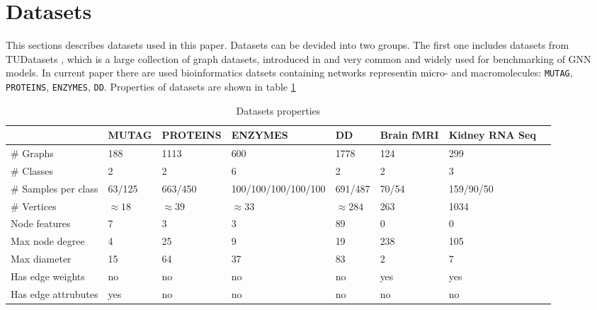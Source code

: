 \section{Datasets}
\label{sec:datasets}

This sections describes datasets used in this paper. Datasets can be devided into two groups.
The first one includes datasets from TUDatasets \cite{TUDataset}, which is
a large collection of graph datasets, introduced in \cite{TUDataset} and very common and widely used for benchmarking of GNN models.
In current paper there are used bioinformatics datsets containing networks representin micro- and macromolecules: \texttt{MUTAG}, \texttt{PROTEINS},
\texttt{ENZYMES}, \texttt{DD}. Properties of datasets are shown in table \ref{tab:datasets}

\begin{center}
    \begin{table}[h]
        \scriptsize
        \begin{tabular}{|l|l|l|l|l|l|l|l|}
            \hline
                                 & MUTAG        & PROTEINS     & ENZYMES             & DD            & Brain fMRI & Kidney RNA Seq \\ \hline
            \# Graphs            & 188          & 1113         & 600                 & 1778          & 124        & 299            \\ \hline
            \# Classes           & 2            & 2            & 6                   & 2             & 2          & 3              \\ \hline
            \# Samples per class & 63/125       & 663/450      & 100/100/100/100/100 & 691/487       & 70/54      & 159/90/50      \\ \hline
            \# Vertices          & $\approx 18$ & $\approx 39$ & $\approx 33$        & $\approx 284$ & 263        & 1034           \\ \hline
            Node features        & 7            & 3            & 3                   & 89            & 0          & 0              \\ \hline
            Max node degree      & 4            & 25           & 9                   & 19            & 238        & 105            \\ \hline
            Max diameter         & 15           & 64           & 37                  & 83            & 2          & 7              \\ \hline
            Has edge weights     & no           & no           & no                  & no            & yes        & yes            \\ \hline
            Has edge attrubutes  & yes          & no           & no                  & no            & no         & no             \\ \hline
        \end{tabular}
    \caption{Datasets properties}
    \label{tab:datasets}
    \end{table}
\end{center}

